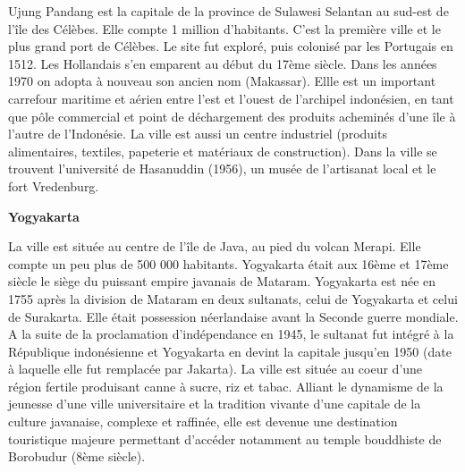 \begin{multicols}{2}
Ujung Pandang est la capitale de la province de Sulawesi Selantan au sud-est de l'île des Célèbes. Elle compte 1 million d'habitants. C'est la première ville et le plus grand port de Célèbes. Le site fut exploré, puis colonisé par les Portugais en 1512. Les Hollandais s'en emparent au début du 17ème siècle. Dans les années 1970 on adopta à nouveau son ancien nom (Makassar). Ellle est un important carrefour maritime et aérien entre l'est et l'ouest de l'archipel indonésien, en tant que pôle commercial et point de déchargement des produits acheminés d'une île à l'autre de l'Indonésie. La ville est aussi un centre industriel (produits alimentaires, textiles, papeterie et matériaux de construction). Dans la ville se trouvent l'université de Hasanuddin (1956), un musée de l'artisanat local et le fort Vredenburg.

\textbf{Yogyakarta}

La ville est située au centre de l'île de Java, au pied du volcan Merapi. Elle compte un peu plus de 500 000 habitants. Yogyakarta était aux 16ème et 17ème siècle le siège du puissant empire javanais de Mataram. Yogyakarta est née en 1755 après la division de Mataram en deux sultanats, celui de Yogyakarta et celui de Surakarta. Elle était possession néerlandaise avant la Seconde guerre mondiale. A la suite de la proclamation d'indépendance en 1945, le sultanat fut intégré à la République indonésienne et Yogyakarta en devint la capitale jusqu'en 1950 (date à laquelle elle fut remplacée par Jakarta). La ville est située au coeur d'une région fertile produisant canne à sucre, riz et tabac. Alliant le dynamisme de la jeunesse d'une ville universitaire et la tradition vivante d'une capitale de la culture javanaise, complexe et raffinée, elle est devenue une destination touristique majeure permettant d'accéder notamment au temple bouddhiste de Borobudur (8ème siècle).

\end{multicols}
